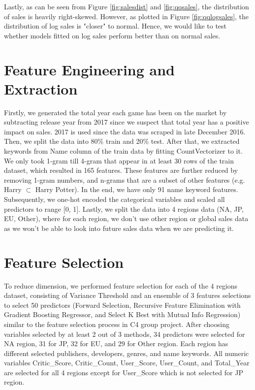 \documentclass[12pt]{article}
\begin{document}
Lastly, as can be seen from Figure \ref{fig:salesdist} and \ref{fig:qqsales}, the distribution of sales is heavily right-skewed. However, as plotted in Figure \ref{fig:qqlogsales}, the distribution of log sales is "closer" to normal. Hence, we would like to test whether models fitted on log sales perform better than on normal sales.

\section{Feature Engineering and Extraction}

Firstly, we generated the total year each game has been on the market by subtracting release year from 2017 since we suspect that total year has a positive impact on sales. 2017 is used since the data was scraped in late December 2016. Then, we split the data into 80\% train and 20\% test. After that, we extracted keywords from Name column of the train data by fitting CountVectorizer to it. We only took 1-gram till 4-gram that appear in at least 30 rows of the train dataset, which resulted in 165 features. These features are further reduced by removing 1-gram numbers, and n-grams that are a subset of other features (e.g. Harry $\subset$ Harry Potter). In the end, we have only 91 name keyword features. Subsequently, we one-hot encoded the categorical variables and scaled all predictors to range [0, 1]. Lastly, we split the data into 4 regions data (NA, JP, EU, Other), where for each region, we don't use other region or global sales data as we won't be able to look into future sales data when we are predicting it.

\section{Feature Selection}

To reduce dimension, we performed feature selection for each of the 4 regions dataset, consisting of Variance Threshold and an ensemble of 3 features selections to select 50 predictors (Forward Selection, Recursive Feature Elimination with Gradient Boosting Regressor, and Select K Best with Mutual Info Regression) similar to the feature selection process in C4 group project. After choosing variables selected by at least 2 out of 3 methods, 34 predictors were selected for NA region, 31 for JP, 32 for EU, and 29 for Other region. Each region has different selected publishers, developers, genres, and name keywords. All numeric variables Critic\_Score, Critic\_Count, User\_Score, User\_Count, and Total\_Year are selected for all 4 regions except for User\_Score which is not selected for JP region. 
\end{document}
